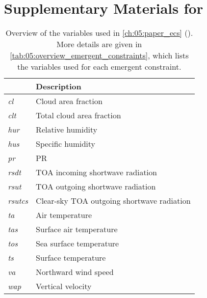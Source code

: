 



\begingroup


\renewcommand{\thesection}{\Alph{section}}


\section{Supplementary Materials for
  \texorpdfstring{}{Chapter \ref{ch:05:paper_ecs}}}
\label{sec:app:si_for_paper_ecs}

\vspace{\fill}

\begin{table}[!h]
  \centering
  \begin{tabulary}{\columnwidth}{>{\em}L L}
    \toprule
     & Description \\
    \midrule
    cl & Cloud area fraction \\
    clt & Total cloud area fraction \\
    hur & Relative humidity \\
    hus & Specific humidity \\
    pr & \Acl{PR} \\
    rsdt & \Acf{TOA} incoming shortwave radiation \\
    rsut & \acs{TOA} outgoing shortwave radiation \\
    rsutcs & Clear-sky \acs{TOA} outgoing shortwave radiation \\
    ta & Air temperature \\
    tas & Surface air temperature \\
    tos & Sea surface temperature \\
    ts & Surface temperature \\
    va & Northward wind speed \\
    wap & Vertical velocity \\
    \bottomrule
  \end{tabulary}
  \caption[
    Overview of the variables used in \cref{ch:05:paper_ecs}.
  ]{
    Overview of the variables used in \cref{ch:05:paper_ecs}
    (). More details are given in
    \cref{tab:05:overview_emergent_constraints}, which lists the variables used
    for each emergent constraint.
  }
  \label{tab:app:a:overview_variables}
\end{table}

